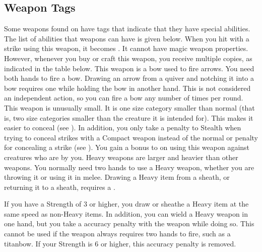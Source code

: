   \subsection{Weapon Tags}\label{Weapon Tags}
    Some weapons found on  have tags that indicate that they have special abilities. The list of abilities that weapons can have is given below.
     When you hit with a strike using this weapon, it becomes .
    It cannot have magic weapon properties.
    However, whenever you buy or craft this weapon, you receive multiple copies, as indicated in the table below.
     This weapon is a bow used to fire arrows.
    You need both hands to fire a bow.
    Drawing an arrow from a quiver and notching it into a bow requires one  while holding the bow in another hand.
    This is not considered an independent action, so you can fire a bow any number of times per round.
     This weapon is unusually small.
    It is one size category smaller than normal (that is, two size categories smaller than the creature it is intended for).
    This makes it easier to conceal (see ).
    In addition, you only take a  penalty to Stealth when trying to conceal strikes with a Compact weapon instead of the normal  or  penalty for concealing a strike (see ).
     You gain a  bonus to  on   using this weapon against creatures who are \grappled by you.
     Heavy weapons are larger and heavier than other weapons.
    You normally need two hands to use a Heavy weapon, whether you are throwing it or using it in melee.
    Drawing a Heavy item from a sheath, or returning it to a sheath, requires a .

    If you have a Strength of 3 or higher, you draw or sheathe a Heavy item at the same speed as non-Heavy items.
    In addition, you can wield a Heavy weapon in one hand, but you take a  accuracy penalty with the weapon while doing so.
    This cannot be used if the weapon always requires two hands to fire, such as a titanbow.
    If your Strength is 6 or higher, this accuracy penalty is removed.

